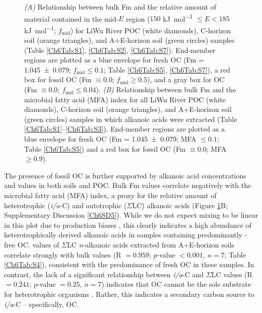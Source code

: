 \begin{figure}[p]
	\caption[$f_{\text{mid}}$ and MFA index vs. Fm mixing plots]{\textit{(A)} Relationship between bulk Fm and the relative amount of material contained in the mid-$E$ region ($150$ \si{kJ.mol^{-1}} $\leq E < 185$ \si{kJ.mol^{-1}}; $f_{\text{mid}}$) for LiWu River POC (white diamonds), C-horizon soil (orange triangles), and A+E-horizon soil (green circles) samples (Table \ref{Ch6Tab:S1}, \ref{Ch6Tab:S2}, \ref{Ch6Tab:S7}). End-member regions are plotted as a blue envelope for fresh OC (Fm = \num{1.045 \pm 0.079}; $f_{\text{mid}} \leq 0.1$; Table \ref{Ch6Tab:S5}, \ref{Ch6Tab:S7}), a red box for fossil OC (Fm $\equiv 0.0$; $f_{\text{mid}} \geq 0.5$), and a gray box for OC (Fm $\equiv 0.0$; $f_{\text{mid}} \leq 0.04$). \textit{(B)} Relationship between bulk Fm and the microbial fatty acid (MFA) index for all LiWu River POC (white diamonds), C-horizon soil (orange triangles), and A+E-horizon soil (green circles) samples in which alkanoic acids were extracted (Table \ref{Ch6Tab:S1}--\ref{Ch6Tab:S3}). End-member regions are plotted as a blue envelope for fresh OC (Fm = \num{1.045 \pm 0.079}; MFA $\leq 0.1$; Table \ref{Ch6Tab:S5}) and a red box for fossil OC (Fm $\equiv 0.0$; MFA $\geq 0.9$).}
	\label{Ch6Fig:3} 
\end{figure}

The presence of fossil OC is further supported by alkanoic acid concentrations and  values in both soils and POC. Bulk Fm values correlate negatively with the microbial fatty acid (MFA) index, a proxy for the relative amount of heterotrophic (\textit{i/a}-C) and autotrophic ($\Sigma$LC) alkanoic acids (Figure \ref{Ch6Fig:3}B; Supplementary Discussion \ref{Ch6SD5}). While we do not expect mixing to be linear in this plot due to production biases \citep{Hemingway:2016bq}, this clearly indicates a high abundance of heterotrophically derived alkanoic acids in samples containing predominantly -free OC.  values of $\Sigma$LC \textit{n}-alkanoic acids extracted from A+E-horizon soils correlate strongly with bulk  values (R $= 0.959$; $p$-value $< 0.001$, $n = 7$; Table \ref{Ch6Tab:S4}), consistent with the predominance of fresh OC in these samples. In contrast, the lack of a significant relationship between \textit{i/a}-C and $\Sigma$LC  values (R $= 0.241$; $p$-value $= 0.25$, $n = 7$) indicates that OC cannot be the sole substrate for heterotrophic organisms \citep{Blair:1985ti}. Rather, this indicates a secondary carbon source to \textit{i/a}-C -- specifically, OC.

